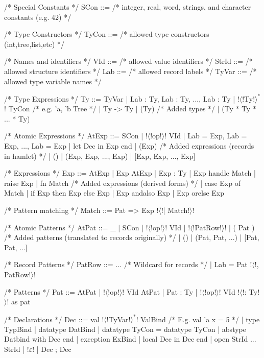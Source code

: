 \documentclass[a4paper,11pt]{article}
\begin{document}
\begin{grm}
/* Special Constants */
SCon ::= /* integer, real, word, strings, 
            and character constants (e.g. 42) */

/* Type Constructors */
TyCon ::= /* allowed type constructors (int,tree,list,etc) */

/* Names and identifiers */
VId   ::= /* allowed value identifiers */
StrId ::= /* allowed structure identifiers */
Lab   ::= /* allowed record labels */
TyVar ::= /* allowed type variable names */

/* Type Expressions */
Ty ::= TyVar
     | { Lab : Ty, Lab : Ty, ..., Lab : Ty }
     | !$\langle$!Ty!$\rangle^*$! TyCon /* e.g. 'a, 'b Tree */
     | Ty -> Ty
     | (Ty)
     /* Added types */
     | (Ty * Ty * ... * Ty)

/* Atomic Expressions */
AtExp ::= SCon 
        | !$\langle$!op!$\rangle$! VId 
        | {Lab = Exp, Lab = Exp, ..., Lab = Exp} 
        | let Dec in Exp end 
        | (Exp) 
        /* Added expressions (records in hamlet) */
        | () 
        | (Exp, Exp, ..., Exp) 
        | [Exp, Exp, ..., Exp]

/* Expressions */
Exp ::= AtExp 
      | Exp AtExp 
      | Exp : Ty 
      | Exp handle Match
      | raise Exp 
      | fn Match
      /* Added expressions (derived forms) */
      | case Exp of Match 
      | if Exp then Exp else Exp
      | Exp andalso Exp 
      | Exp orelse Exp

/* Pattern matching */
Match ::= Pat => Exp !$\langle$!| Match!$\rangle$!

/* Atomic Patterns */
AtPat ::= _ 
        | SCon
        | !$\langle$!op!$\rangle$! VId 
        | { !$\langle$!PatRow!$\rangle$! }
        | ( Pat )
        /* Added patterns (translated to records originally) */
        | ()
        | (Pat, Pat, ...)
        | [Pat, Pat, ...]

/* Record Patterns */
PatRow ::= ... /* Wildcard for records */
         | Lab = Pat !$\langle$!, PatRow!$\rangle$!

/* Patterns */
Pat ::= AtPat
      | !$\langle$!op!$\rangle$! VId AtPat
      | Pat : Ty
      | !$\langle$!op!$\rangle$! VId !$\langle$!: Ty!$\rangle$! as pat

/* Declarations */
Dec ::= val !$\langle$!TyVar!$\rangle^*$! ValBind /* E.g. val 'a x = 5 */
      | type TypBind
      | datatype DatBind
      | datatype TyCon = datatype TyCon
      | abstype Datbind with Dec end
      | exception ExBind
      | local Dec in Dec end
      | open StrId ... StrId
      | !$\varepsilon$!
      | Dec ; Dec
      

\end{grm}
\end{document}
